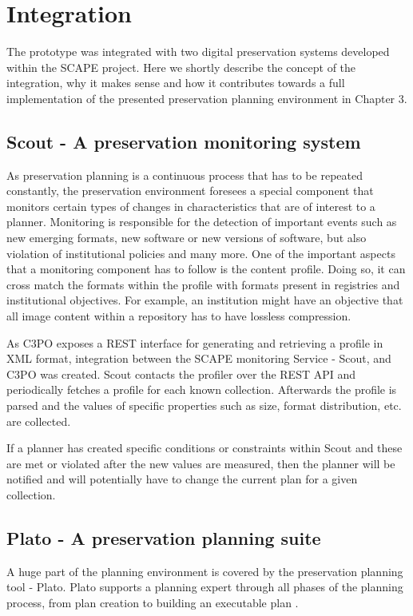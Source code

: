 \section{Integration}
The prototype was integrated with two digital preservation systems developed within the SCAPE project. Here we shortly describe the concept of the integration, why it makes sense and how it contributes towards a full implementation of the presented preservation planning environment in Chapter 3.

\subsection{Scout - A preservation monitoring system}
As preservation planning is a continuous process that has to be repeated constantly, the preservation environment
foresees a special component that monitors certain types of changes in characteristics that are of interest to a planner.
Monitoring is responsible for the detection of important events such as new emerging formats, new software or new versions of software, but also violation of institutional policies and many more. 
One of the important aspects that a monitoring component has to follow is the content profile. Doing so, it can cross match the formats within the profile with formats present in registries and institutional objectives. For example, an institution might have an objective that all image content within a repository has to have lossless compression.

As C3PO exposes a REST interface for generating and retrieving a profile in XML format, integration between the SCAPE monitoring Service - Scout, and C3PO was created. Scout contacts the profiler over the REST API and periodically fetches a profile for each known collection. Afterwards the profile is parsed and the values of specific properties such as size, format distribution, etc. are collected.

If a planner has created specific conditions or constraints within Scout and these are met or violated after the new values are measured, then the planner will be notified and will potentially have to change the current plan for a given collection.

\subsection{Plato - A preservation planning suite}
A huge part of the planning environment is covered by the preservation planning tool - Plato.
Plato supports a planning expert through all phases of the planning process, from plan creation to building an executable plan .

